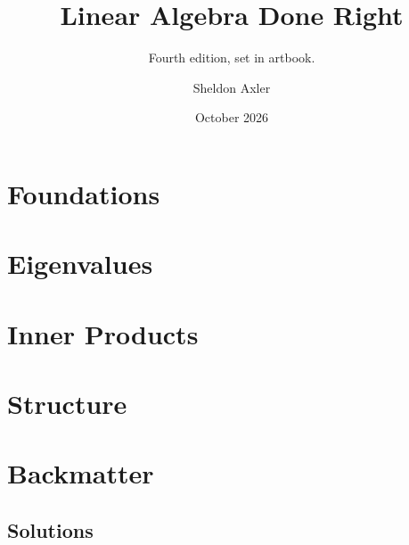 \documentclass[9pt,openany,oneside]{book}
\title{Linear Algebra Done Right}
\subtitle{Fourth edition, set in artbook.}
\author{Sheldon Axler}
\date{October 2026}
\begin{document}
\maketitle
\tableofcontents



\part{Foundations}




\part{Eigenvalues}



\part{Inner Products}



\part{Structure}



\backmatter
\part{Backmatter}
\chapter{Solutions}

\printsolutionsbysection

\end{document}
